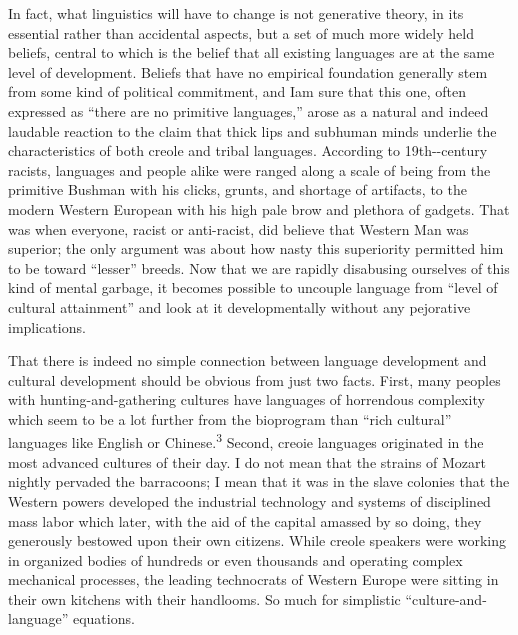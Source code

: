 
In fact, what linguistics will have to change is not generative theory, in its essential rather than accidental aspects, but a set of much more widely held beliefs, central to which is the belief that all existing languages are at the same level of development. Beliefs that have no empirical foundation generally stem from some kind of politi\-cal commitment, and Iam sure that this one, often expressed as ``there are no primitive languages,'' arose as a natural and indeed laudable reaction to the claim that thick lips and subhuman minds underlie the characteristics of both creole and tribal languages. According to 19th-{}-century racists, languages and people alike were ranged along a scale of being from the primitive Bushman with his clicks, grunts, and shortage of artifacts, to the modern Western European with his high pale brow and plethora of gadgets. That was when everyone, racist or anti-racist, did believe that Western Man was superior; the only argument was about how nasty this superiority permitted him to be toward ``lesser'' breeds. Now that we are rapidly disabusing our\-selves of this kind of mental garbage, it becomes possible to uncouple language from ``level of cultural attainment'' and look at it develop\-mentally without any pejorative implications.

That there is indeed no simple connection between language development and cultural development should be obvious from just two facts. First, many peoples with hunting-and-gathering cultures have languages of horrendous complexity which seem to be a lot further from the bioprogram than ``rich cultural'' languages like English or Chinese.\textsuperscript{3} Second, creoie languages originated in the most advanced cultures of their day. I do not mean that the strains of Mozart nightly pervaded the barracoons; I mean that it was in the slave colonies that the Western powers developed the industrial technology and systems of disciplined mass labor which later, with the aid of the
capital amassed by so doing, they generously bestowed upon their own citizens. While creole speakers were working in organized bodies of hundreds or even thousands and operating complex mechanical processes, the leading technocrats of Western Europe were sitting in their own kitchens with their handlooms. So much for simplistic ``culture-and-language'' equations.


